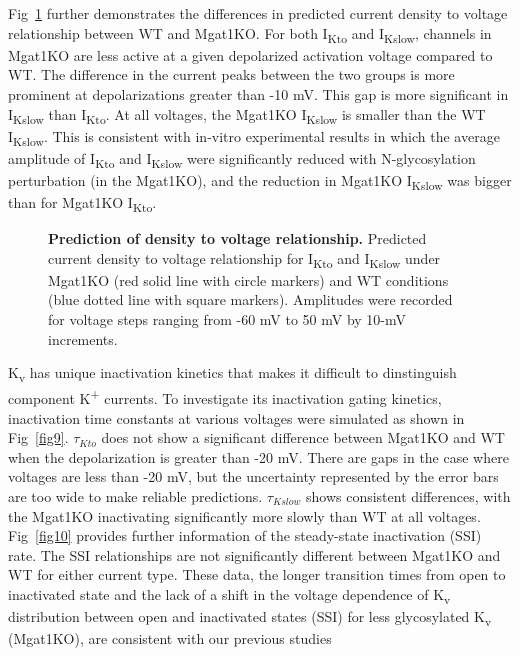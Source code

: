 \documentclass[10pt,letterpaper]{article}
\begin{document}
Fig~\ref{fig8} further demonstrates the differences in predicted current density to voltage relationship between WT and Mgat1KO. For both I\textsubscript{Kto} and I\textsubscript{Kslow}, channels in Mgat1KO are less active at a given depolarized activation voltage compared to WT. The difference in the current peaks between the two groups is more prominent at depolarizations greater than -10 mV. This gap is more significant in I\textsubscript{Kslow} than I\textsubscript{Kto}. At all voltages, the Mgat1KO I\textsubscript{Kslow} is smaller than the WT I\textsubscript{Kslow}. This is consistent with in-vitro experimental results in which the average amplitude of I\textsubscript{Kto} and I\textsubscript{Kslow} were significantly reduced with N-glycosylation perturbation (in the Mgat1KO), and the reduction in Mgat1KO I\textsubscript{Kslow} was bigger than for Mgat1KO I\textsubscript{Kto}. 

\begin{figure}[!ht]
    \centering
    \caption{{\bf Prediction of density to voltage relationship.} 
    Predicted current density to voltage relationship for I\textsubscript{Kto} and I\textsubscript{Kslow} under Mgat1KO (red solid line with circle markers) and WT conditions (blue dotted line with square markers). Amplitudes were recorded for voltage steps ranging from -60 mV to 50 mV by 10-mV increments.} 
    \label{fig8}
\end{figure}

K\textsubscript{v} has unique inactivation kinetics that makes it difficult to dinstinguish component K\textsuperscript{+} currents. To investigate its inactivation gating kinetics, inactivation time constants at various voltages were simulated as shown in Fig~\ref{fig9}. $\tau_{Kto}$ does not show a significant difference between Mgat1KO and WT when the depolarization is greater than -20 mV. There are gaps in the case where voltages are less than -20 mV, but the uncertainty represented by the error bars are too wide to make reliable predictions. $\tau_{Kslow}$ shows consistent differences, with the Mgat1KO inactivating significantly more slowly than WT at all voltages. Fig~\ref{fig10} provides further information of the steady-state inactivation (SSI) rate. The SSI relationships are not significantly different between Mgat1KO and WT for either current type. These data, the longer transition times from open to inactivated state and the lack of a shift in the voltage dependence of K\textsubscript{v} distribution between open and inactivated states (SSI) for less glycosylated K\textsubscript{v} (Mgat1KO), are consistent with our previous studies \cite{schwetz2010n, ednie2015reduced, du2017}
\end{document}
